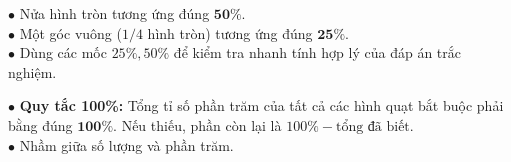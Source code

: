 \documentclass[14pt,a4paper,oneside]{extbook}
\begin{document}
\noindent
\begin{minipage}[t]{0.54\textwidth}
  \begin{tcolorbox}[
    enhanced,
    title={\footnotesize\bfseries\color{white}\faEye\ Mẹo ước lượng trực quan nhanh},
    colback=green!3!white,
    colframe=green!60!black,
    arc=2.5mm, boxrule=0.8pt, top=1.8mm, bottom=1.8mm, left=2.2mm, right=2.2mm
  ]
    \footnotesize
    $\bullet$ Nửa hình tròn tương ứng đúng $\mathbf{50\%}$.\\
    $\bullet$ Một góc vuông ($1/4$ hình tròn) tương ứng đúng $\mathbf{25\%}$.\\
    $\bullet$ Dùng các mốc $25\%, 50\%$ để kiểm tra nhanh tính hợp lý của đáp án trắc nghiệm.
  \end{tcolorbox}
\end{minipage}%
\hfill
\begin{minipage}[t]{0.44\textwidth}
  \begin{tcolorbox}[
    enhanced,
    title={\footnotesize\bfseries\color{white}\faExclamationTriangle\ Mẹo tránh bẫy trắc nghiệm},
    colback=red!2!white,
    colframe=red!70!black,
    arc=2.5mm, boxrule=0.8pt, top=1.8mm, bottom=1.8mm, left=2.2mm, right=2.2mm
  ]
    \footnotesize
    $\bullet$ \textbf{Quy tắc 100\%:} Tổng tỉ số phần trăm của tất cả các hình quạt bắt buộc phải bằng đúng $\mathbf{100\%}$. Nếu thiếu, phần còn lại là $100\% - \text{tổng đã biết}$.\\
    $\bullet$ Nhầm giữa số lượng và phần trăm.
  \end{tcolorbox}
\end{minipage}
\end{document}
